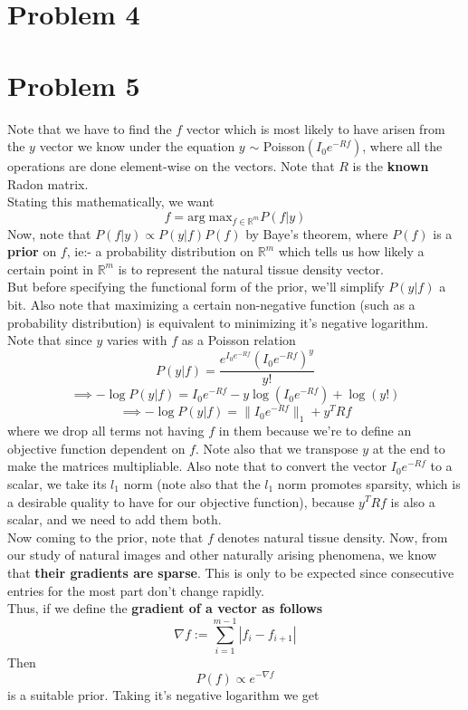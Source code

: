 \documentclass[a4paper,14pt]{article}
\numberwithin{definition}{section}
\numberwithin{mytheorem}{subsection}
\begin{document}
\section{Problem 4}
\section{Problem 5}
Note that we have to find the $f$ vector which is most likely to have arisen from the $y$ vector we know under the equation $y$ $\sim$ Poisson$(I_0e^{-Rf})$, where all the operations are done element-wise on the vectors. Note that $R$ is the \textbf{known} Radon matrix.\\
Stating this mathematically, we want
$$f = \mathrm{arg}\;\mathrm{max}_{f \in \mathbb{R}^m} P(f|y)$$
Now, note that $P(f|y) \propto P(y|f)P(f)$ by Baye's theorem, where $P(f)$ is a \textbf{prior} on $f$, ie:- a probability distribution on $\mathbb{R}^m$ which tells us how likely a certain point in $\mathbb{R}^m$ is to represent the natural tissue density vector.\\
But before specifying the functional form of the prior, we'll simplify $P(y|f)$ a bit. Also note that maximizing a certain non-negative function (such as a probability distribution) is equivalent to minimizing it's negative logarithm.\\
Note that since $y$ varies with $f$ as a Poisson relation
$$P(y|f) = \frac{e^{I_0e^{-Rf}}(I_0e^{-Rf})^y}{y!}$$
$$\implies -\log P(y|f) = I_0e^{-Rf} - y\log (I_0e^{-Rf}) + \log (y!)$$
$$\implies -\log P(y|f) = \lVert I_0e^{-Rf}\rVert_1 + y^TRf$$
where we drop all terms not having $f$ in them because we're to define an objective function dependent on $f$. Note also that we transpose $y$ at the end to make the matrices multipliable. Also note that to convert the vector $I_0e^{-Rf}$ to a scalar, we take its $l_1$ norm (note also that the $l_1$ norm promotes sparsity, which is a desirable quality to have for our objective function), because $y^TRf$ is also a scalar, and we need to add them both.\\
Now coming to the prior, note that $f$ denotes natural tissue density. Now, from our study of natural images and other naturally arising phenomena, we know that \textbf{their gradients are sparse}. This is only to be expected since consecutive entries for the most part don't change rapidly.\\
Thus, if we define the \textbf{gradient of a vector as follows}
$$\nabla f := \sum^{m - 1}_{i = 1} |f_i - f_{i + 1}|$$
Then
$$P(f) \propto e^{-\nabla f} $$
is a suitable prior. Taking it's negative logarithm we get 
\end{document}
